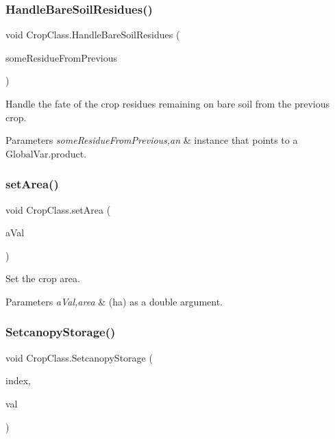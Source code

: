 \subsubsection{\texorpdfstring{HandleBareSoilResidues()}{HandleBareSoilResidues()}}
{\footnotesize\ttfamily void Crop\+Class.\+Handle\+Bare\+Soil\+Residues (\begin{DoxyParamCaption}\item[{\mbox{\hyperlink{class_global_vars_1_1product}{Global\+Vars.\+product}}}]{some\+Residue\+From\+Previous }\end{DoxyParamCaption})\hspace{0.3cm}{\ttfamily [inline]}}



Handle the fate of the crop residues remaining on bare soil from the previous crop. 


\begin{DoxyParams}{Parameters}
{\em some\+Residue\+From\+Previous,an} & instance that points to a Global\+Var.\+product. \\
\hline
\end{DoxyParams}
\mbox{\label{class_crop_class_a4e56ddc1b7f6cc37bc9e540706c1fac4}} 
\subsubsection{\texorpdfstring{setArea()}{setArea()}}
{\footnotesize\ttfamily void Crop\+Class.\+set\+Area (\begin{DoxyParamCaption}\item[{double}]{a\+Val }\end{DoxyParamCaption})\hspace{0.3cm}{\ttfamily [inline]}}



Set the crop area. 


\begin{DoxyParams}{Parameters}
{\em a\+Val,area} & (ha) as a double argument. \\
\hline
\end{DoxyParams}
\mbox{\label{class_crop_class_a48d302f03ea98625f9f5ae883d1c39cb}} 
\subsubsection{\texorpdfstring{SetcanopyStorage()}{SetcanopyStorage()}}
{\footnotesize\ttfamily void Crop\+Class.\+Setcanopy\+Storage (\begin{DoxyParamCaption}\item[{int}]{index,  }\item[{double}]{val }\end{DoxyParamCaption})\hspace{0.3cm}{\ttfamily [inline]}}



